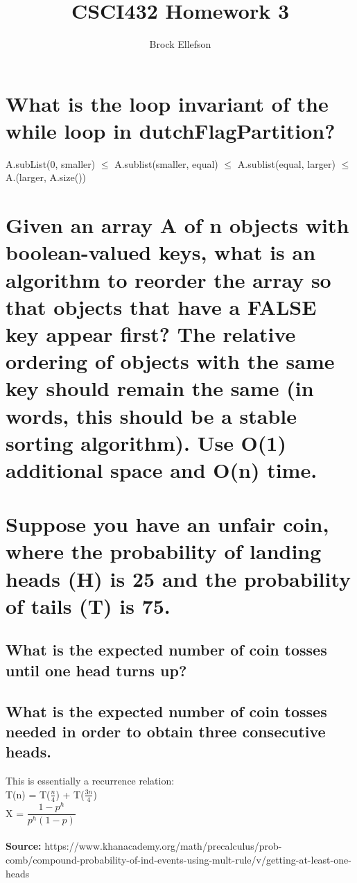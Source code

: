 \documentclass[10pt,letterpaper]{article}
\author{Brock Ellefson}
\title{CSCI432 Homework 3}
\begin{document}
\maketitle
\section{What is the loop invariant of the while loop in dutchFlagPartition?}
A.subList(0, smaller) $\leq$ A.sublist(smaller, equal) $\leq$ A.sublist(equal, larger) $\leq$ A.(larger, A.size())

\section{Given an array A of n objects
with boolean-valued keys, what is an algorithm to reorder
the array so that objects that have a FALSE key
appear first? The relative ordering of objects with
the same key should remain the same (in words, this
should be a stable sorting algorithm). Use O(1) additional
space and O(n) time.}

\section{Suppose you have an unfair
coin, where the probability of landing heads (H) is
25 and the probability of tails (T) is 75.}

\subsection{What is the expected number of coin tosses until one head
turns up?}

\subsection{What is the expected number of coin tosses
needed in order to obtain three consecutive heads.}

This is essentially a recurrence relation:\\
T(n) = T($\frac{n}{4}$) + T($\frac{3n}{4}$) \\
X = $\dfrac{1-p^{h}}{p^{h}(1-p)}$\\\\
\textbf{Source:} https://www.khanacademy.org/math/precalculus/prob-comb/compound-probability-of-ind-events-using-mult-rule/v/getting-at-least-one-heads
\end{document}
